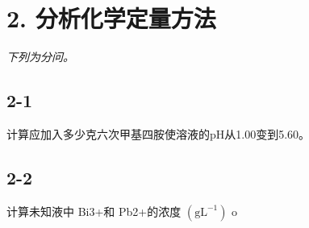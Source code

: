\section*{2. 分析化学定量方法}
\textit{下列为分问。}

\subsection*{2-1}
计算应加⼊多少克六次甲基四胺使溶液的pH从1.00变到5.60。

\subsection*{2-2}
计算未知液中 Bi3+和 Pb2+的浓度 $( \mathrm { g } \mathrm { L } ^ { - 1 } )$ o
